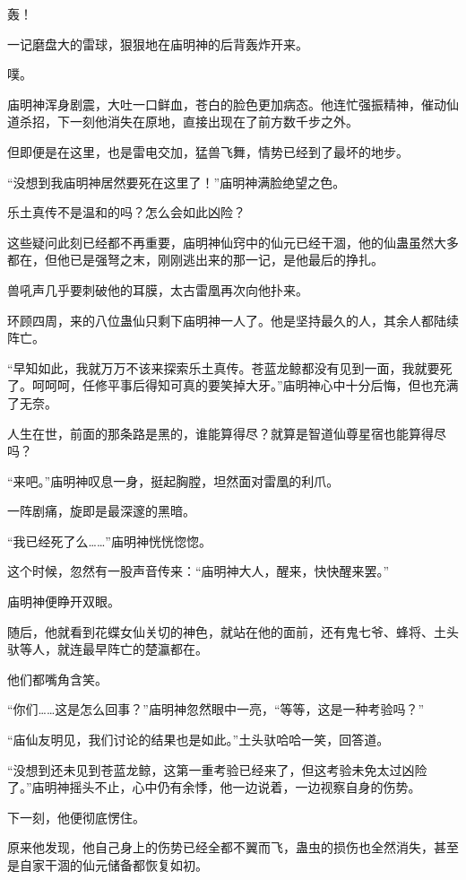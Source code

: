 
\begin{this_body}

轰！

一记磨盘大的雷球，狠狠地在庙明神的后背轰炸开来。

噗。

庙明神浑身剧震，大吐一口鲜血，苍白的脸色更加病态。他连忙强振精神，催动仙道杀招，下一刻他消失在原地，直接出现在了前方数千步之外。

但即便是在这里，也是雷电交加，猛兽飞舞，情势已经到了最坏的地步。

“没想到我庙明神居然要死在这里了！”庙明神满脸绝望之色。

乐土真传不是温和的吗？怎么会如此凶险？

这些疑问此刻已经都不再重要，庙明神仙窍中的仙元已经干涸，他的仙蛊虽然大多都在，但他已是强弩之末，刚刚逃出来的那一记，是他最后的挣扎。

兽吼声几乎要刺破他的耳膜，太古雷凰再次向他扑来。

环顾四周，来的八位蛊仙只剩下庙明神一人了。他是坚持最久的人，其余人都陆续阵亡。

“早知如此，我就万万不该来探索乐土真传。苍蓝龙鲸都没有见到一面，我就要死了。呵呵呵，任修平事后得知可真的要笑掉大牙。”庙明神心中十分后悔，但也充满了无奈。

人生在世，前面的那条路是黑的，谁能算得尽？就算是智道仙尊星宿也能算得尽吗？

“来吧。”庙明神叹息一身，挺起胸膛，坦然面对雷凰的利爪。

一阵剧痛，旋即是最深邃的黑暗。

“我已经死了么……”庙明神恍恍惚惚。

这个时候，忽然有一股声音传来：“庙明神大人，醒来，快快醒来罢。”

庙明神便睁开双眼。

随后，他就看到花蝶女仙关切的神色，就站在他的面前，还有鬼七爷、蜂将、土头驮等人，就连最早阵亡的楚瀛都在。

他们都嘴角含笑。

“你们……这是怎么回事？”庙明神忽然眼中一亮，“等等，这是一种考验吗？”

“庙仙友明见，我们讨论的结果也是如此。”土头驮哈哈一笑，回答道。

“没想到还未见到苍蓝龙鲸，这第一重考验已经来了，但这考验未免太过凶险了。”庙明神摇头不止，心中仍有余悸，他一边说着，一边视察自身的伤势。

下一刻，他便彻底愣住。

原来他发现，他自己身上的伤势已经全都不翼而飞，蛊虫的损伤也全然消失，甚至是自家干涸的仙元储备都恢复如初。


\end{this_body}
